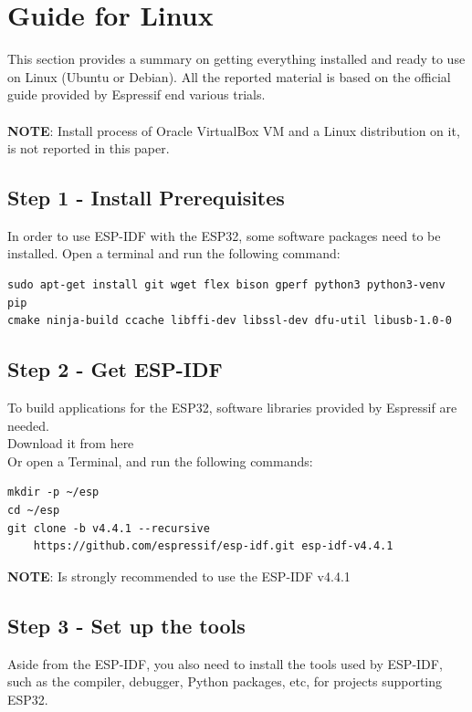 \section{Guide for Linux}
This section provides a summary on getting everything installed and ready to use on Linux (Ubuntu or Debian).
All the reported material is based on the official guide provided by Espressif\cite{Espressif} end various trials.\\
\\\textbf{NOTE}: Install process of Oracle VirtualBox VM and a Linux distribution on it, is not reported in this paper. 

\subsection{Step 1 - Install Prerequisites}
In order to use ESP-IDF with the ESP32, some software packages need to be installed.
Open a terminal and run the following command:

\begin{lstlisting}
sudo apt-get install git wget flex bison gperf python3 python3-venv pip
cmake ninja-build ccache libffi-dev libssl-dev dfu-util libusb-1.0-0
\end{lstlisting}

\subsection{Step 2 - Get ESP-IDF}
To build applications for the ESP32, software libraries provided by Espressif are needed.
\\Download it from here \cite*[\href{https://github.com/espressif/esp-idf.git}{ESP-IDF}]{Git_ESP}
\\Or open a Terminal, and run the following commands:

\begin{lstlisting}
mkdir -p ~/esp
cd ~/esp
git clone -b v4.4.1 --recursive 
    https://github.com/espressif/esp-idf.git esp-idf-v4.4.1
\end{lstlisting}

\textbf{NOTE}: Is strongly recommended to use the ESP-IDF v4.4.1
\subsection{Step 3 - Set up the tools}
Aside from the ESP-IDF, you also need to install the tools used by ESP-IDF, such as the compiler, debugger, Python packages, etc, for projects supporting ESP32.

